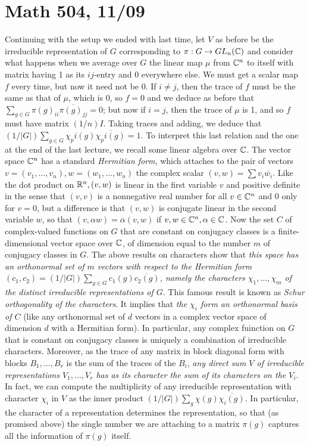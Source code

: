 \documentclass[10pt]{article}
\begin{document}
\section*{Math 504, 11/09}

Continuing with the setup we ended with last time, let $V$ as before be
the irreducible representation of $G$ corresponding to $\pi:G\rightarrow
GL_n(\Bbb C)$ and consider what happens when we average over $G$ the
linear map $\mu$ from $\Bbb C^n$ to itself with matrix having 1 as its
$ij$-entry and 0 everywhere else. We must get a scalar map $f$ every
time, but now it need not be 0. If $i\ne j$, then the trace of $f$ must
be the same as that of $\mu$, which is 0, so $f=0$ and we deduce as
before that $\sum_{g\in G} \pi(g)_{ii} \overline{\pi(g)_{jj}} = 0$; but
now if $i=j$, then the trace of $\mu$ is 1, and so $f$ must have matrix
$(1/n)I$. Taking traces and adding, we deduce that $(1/ | G |)\sum_{g\in
  G} \chi_pi(g)\overline{\chi_pi(g)} = 1$. To interpret this last
relation and the one at the end of the last lecture, we recall some
linear algebra over $\Bbb C$. The vector space $\Bbb C^n$ has a standard
{\sl Hermitian form}, which attaches to the pair of vectors $v =
(v_1,\ldots,v_n), w = (w_1,\ldots,w_n)$ the complex scalar $(v,w) = \sum
v_i\overline{w_i}$. Like the dot product on $\Bbb R^n, (v,w)$ is linear
in the first variable $v$ and positive definite in the sense that
$(v,v)$ is a nonnegative real number for all $v\in\Bbb C^n$ and 0 only
for $v=0$, but a difference is that $(v,w)$ is conjugate linear in the
second variable $w$, so that $(v,\alpha w) = \overline{\alpha}(v,w)$ if
$v,w\in\Bbb C^n,\alpha\in\Bbb C$. Now the set $C$ of complex-valued
functions on $G$ that are constant on conjugacy classes is a
finite-dimensional vector space over $\Bbb C$, of dimension equal to the
number $m$ of conjugacy classes in $G$. The above results on characters
show that {\sl this space has an orthonormal set of $m$ vectors with
  respect to the Hermitian form $(c_1,c_2) = (1/ |G| )\sum_{g\in G}
  c_1(g)\overline{c_2(g)}$, namely the characters $\chi_1,\ldots,\chi_m$
  of the distinct irreducible representations of $G$}. This famous
result is known as {\sl Schur orthogonality of the characters}. It
implies that {\sl the $\chi_i$ form an orthonormal basis of $C$} (like
any orthonormal set of $d$ vectors in a complex vector space of
dimension $d$ with a Hermitian form). In particular, any complex
fuinction on $G$ that is constant on conjugacy classes is uniquely a
combination of irreducible characters. Moreover, as the trace of any
matrix in block diagonal form with blocks $B_1,\ldots,B_r$ is the sum of
the traces of the $B_i$, {\sl any direct sum $V$ of irreducible
  representations $V_1,\ldots,V_r$ has as its character the sum of its
  characters on the $V_i$}. In fact, we can compute the multiplicity of
any irreducible representation with character $\chi_i$ in $V$ as the
inner product $(1/|G|) \sum_g \chi(g)\overline{\chi_i(g)}$. In
particular, the character of a representation determines the
representation, so that (as promised above) the single number we are
attaching to a matrix $\pi(g)$ captures all the information of $\pi(g)$
itself.
\end{document}
